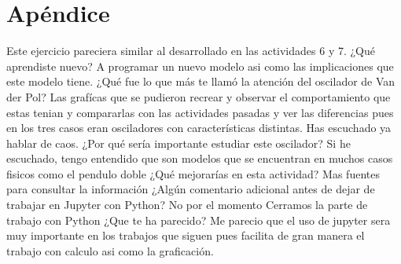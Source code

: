 \documentclass{article}
\begin{document}
\section{Apéndice}
Este ejercicio pareciera similar al desarrollado en las actividades 6 y 7. ¿Qué aprendiste nuevo?
\newline
A programar un nuevo modelo asi como las implicaciones que este modelo tiene.
\newline
¿Qué fue lo que más te llamó la atención del oscilador de Van der Pol?
\newline
Las grafícas que se pudieron recrear y observar el comportamiento que estas tenian y compararlas con las actividades pasadas y ver las diferencias pues en los tres casos eran osciladores con características distintas.
\newline
Has escuchado ya hablar de caos. ¿Por qué sería importante estudiar este oscilador?
\newline
Si he escuchado, tengo entendido que son modelos que se encuentran en muchos casos fisicos como el pendulo doble
\newline
¿Qué mejorarías en esta actividad?
\newline
Mas fuentes para consultar la información
\newline
¿Algún comentario adicional antes de dejar de trabajar en Jupyter con Python?
\newline
No por el momento
\newline
Cerramos la parte de trabajo con Python ¿Que te ha parecido?
\newline
Me parecio que el uso de jupyter sera muy importante en los trabajos que siguen pues facilita de gran manera el trabajo con calculo asi como la graficación.
\end{document}
